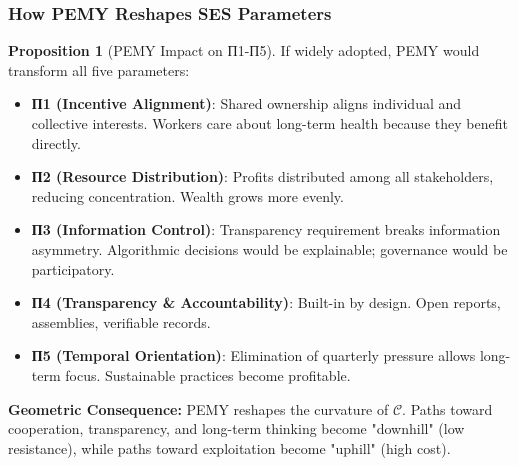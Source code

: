 \documentclass[11pt,a4paper]{article}
\newcommand{\SES}{\textbf{SES}}
\newcommand{\CC}{$\mathcal{C}$}
\theoremstyle{definition}
\newtheorem{proposition}{Proposition}[section]
\theoremstyle{remark}
\begin{document}
\subsubsection{How PEMY Reshapes \SES{} Parameters}

\begin{proposition}[PEMY Impact on П1-П5]
\label{prop:pemy_impact}
If widely adopted, PEMY would transform all five parameters:

\begin{itemize}
\item \textbf{П1 (Incentive Alignment)}: Shared ownership aligns individual and collective interests. Workers care about long-term health because they benefit directly.

\item \textbf{П2 (Resource Distribution)}: Profits distributed among all stakeholders, reducing concentration. Wealth grows more evenly.

\item \textbf{П3 (Information Control)}: Transparency requirement breaks information asymmetry. Algorithmic decisions would be explainable; governance would be participatory.

\item \textbf{П4 (Transparency \& Accountability)}: Built-in by design. Open reports, assemblies, verifiable records.

\item \textbf{П5 (Temporal Orientation)}: Elimination of quarterly pressure allows long-term focus. Sustainable practices become profitable.
\end{itemize}

\textbf{Geometric Consequence:} PEMY reshapes the curvature of \CC{}. Paths toward cooperation, transparency, and long-term thinking become "downhill" (low resistance), while paths toward exploitation become "uphill" (high cost).
\end{proposition}
\end{document}
